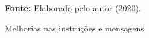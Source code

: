 \begin{figure}[ht!]
\centering

\caption{\textmd{Melhorias nas instruções e mensagens}}
\label{fig:mensagens}

\par\medskip\textbf{Fonte:} Elaborado pelo autor (2020). \par\medskip

\end{figure}

